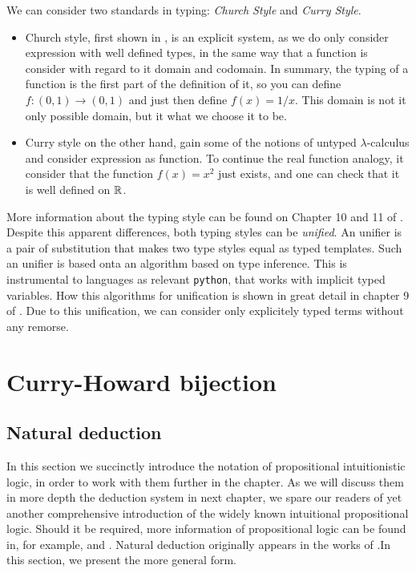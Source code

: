 We can consider two standards in typing: \emph{Church Style} and \emph{Curry Style}.
\begin{itemize}
\item Church style,  first shown in \cite{church1940formulation}, is an explicit system, as we do only consider expression with well defined types, in the same way that a function is consider with regard to it domain and codomain. In summary, the typing of a function is the first part of the definition of it, so you can define $f:(0,1)\to (0,1)$ and just then define $f(x)=1/x$. This domain is not it only possible domain, but it what we choose it to be. 
\item Curry style on the other hand, gain some of the notions of untyped $\lambda$-calculus and consider expression as function. To continue the real function analogy, it consider that the function $f(x)=x^2$ just exists, and one can check that it is well defined on $\mathbb{R}$. \\
\end{itemize}
More information about the typing style can be found on Chapter 10 and 11 of \cite{hindley2008lambda}. \\

Despite this apparent differences, both typing styles can be \emph{unified}. An unifier is a pair of substitution that makes two type styles equal as typed templates. Such an unifier is based onta an algorithm based on type inference. This is instrumental to languages  as relevant \texttt{python}, that works with implicit typed variables. How this algorithms for unification is shown in great detail in chapter 9  of \cite{selinger2008lecture}. Due to this unification, we can consider only explicitely typed terms without any remorse.

\section{Curry-Howard bijection}
\subsection{Natural deduction}
In this section we succinctly introduce the notation of propositional intuitionistic logic, in order to work with them further in the chapter. As we will discuss them in more depth the deduction system in next chapter, we spare our readers of yet another comprehensive introduction of the widely known intuitional propositional logic. Should it be required, more information of propositional logic can be found in, for example, \cite{marek2009introduction} and \cite{wadler2015propositions}. Natural deduction originally appears in the works of \cite{gentzen1935untersuchungen}.In this section, we present the more general form. \\

